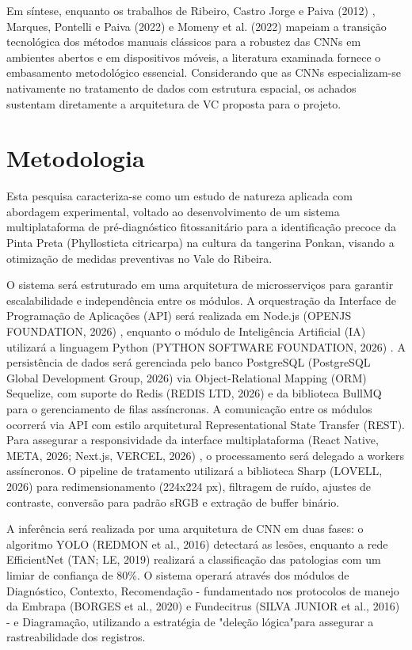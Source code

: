 \documentclass[11pt,a4paper]{article}
\begin{document}
Em síntese, enquanto os trabalhos de Ribeiro, Castro Jorge e Paiva (2012) \cite{Ribeiro2012}, Marques, Pontelli e Paiva (2022) \cite{Marques2022} e  Momeny et al. (2022) \cite{Momeny2022} mapeiam a transição tecnológica dos métodos manuais clássicos para a robustez das CNNs em ambientes abertos e em dispositivos móveis, a literatura examinada fornece o embasamento metodológico essencial. Considerando que as CNNs especializam-se nativamente no tratamento de dados com estrutura espacial, os achados sustentam diretamente a arquitetura de VC proposta para o projeto.

\section{Metodologia}

Esta pesquisa caracteriza-se como um estudo de natureza aplicada com abordagem experimental, voltado ao desenvolvimento de um sistema multiplataforma de pré-diagnóstico fitossanitário para a identificação precoce da Pinta Preta (Phyllosticta citricarpa) na cultura da tangerina Ponkan, visando a otimização de medidas preventivas no Vale do Ribeira.

O sistema será estruturado em uma arquitetura de microsserviços para garantir escalabilidade e independência entre os módulos. A orquestração da Interface de Programação de Aplicações (API) será realizada em Node.js (OPENJS FOUNDATION, 2026) \cite{NodeJS2026}, enquanto o módulo de Inteligência Artificial (IA) utilizará a linguagem Python (PYTHON SOFTWARE FOUNDATION, 2026) \cite{Python2026}. A persistência de dados será gerenciada pelo banco PostgreSQL (PostgreSQL Global Development Group, 2026) \cite{PostgreSQL2023} via Object-Relational Mapping (ORM) Sequelize, com suporte do Redis (REDIS LTD, 2026) \cite{Redis2026} e da biblioteca BullMQ para o gerenciamento de filas assíncronas. A comunicação entre os módulos ocorrerá via API com estilo arquitetural Representational State Transfer (REST). Para assegurar a responsividade da interface multiplataforma (React Native, META, 2026; Next.js, VERCEL, 2026) \cite{ReactNative2026} \cite{NextJS2026}, o processamento será delegado a workers assíncronos. O pipeline de tratamento utilizará a biblioteca Sharp (LOVELL, 2026) \cite{Fuller2026} para redimensionamento (224x224 px), filtragem de ruído, ajustes de contraste, conversão para padrão sRGB e extração de buffer binário.

A inferência será realizada por uma arquitetura de CNN em duas fases: o algoritmo YOLO (REDMON et al., 2016) \cite{Redmon2016} detectará as lesões, enquanto a rede EfficientNet (TAN; LE, 2019) \cite{TanLe2019} realizará a classificação das patologias com um limiar de confiança de 80\%. O sistema operará através dos módulos de Diagnóstico, Contexto, Recomendação - fundamentado nos protocolos de manejo da Embrapa (BORGES et al., 2020) \cite{Borges2021} e Fundecitrus (SILVA JUNIOR et al., 2016) \cite{SilvaJunior2016} - e Diagramação, utilizando a estratégia de "deleção lógica"para assegurar a rastreabilidade dos registros.
\end{document}
